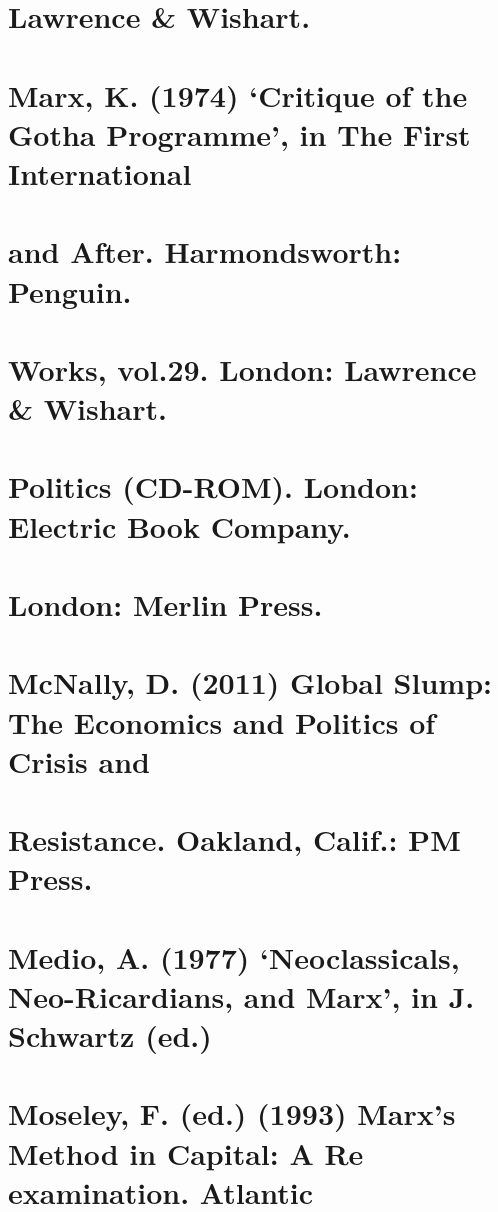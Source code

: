 \section{Lawrence & Wishart.}


\section{Marx, K. (1974) ‘Critique of the Gotha Programme’, in The First International}


\section{and After. Harmondsworth: Penguin.}


\section{Works, vol.29. London: Lawrence & Wishart.}


\section{Politics (CD-ROM). London: Electric Book Company.}


\section{London: Merlin Press.}


\section{McNally, D. (2011) Global Slump: The Economics and Politics of Crisis and}


\section{Resistance. Oakland, Calif.: PM Press.}


\section{Medio, A. (1977) ‘Neoclassicals, Neo-Ricardians, and Marx’, in J. Schwartz (ed.)}


\section{Moseley, F. (ed.) (1993) Marx’s Method in Capital: A Re examination. Atlantic}



